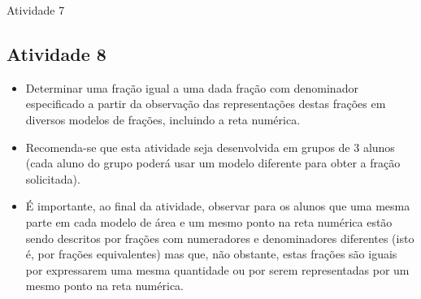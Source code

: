 \begin{multicols}{2}
\begin{resposta*}{Atividade 7}
  
\end{resposta*}

\Bg
\Bg

\subsection{Atividade 8}

\begin{itemize} %
    \item       Determinar uma fração igual a uma dada fração com denominador 
especificado a partir da observação das representações destas frações em 
diversos modelos de frações, incluindo a reta numérica.
\end{itemize} %
  
 
\begin{itemize} %
    \item       Recomenda-se que esta atividade seja desenvolvida em grupos de 3 
alunos (cada aluno do grupo poderá usar um modelo diferente para obter a fração 
solicitada).
    \item       É importante, ao final da atividade, observar para os alunos que 
uma mesma parte em cada modelo de área e um mesmo ponto na reta numérica estão 
sendo descritos por frações com numeradores e denominadores diferentes (isto é, 
por frações equivalentes) mas que, não obstante, estas frações são iguais por 
expressarem uma mesma quantidade ou por serem representadas por um mesmo ponto 
na reta numérica. 
\end{itemize} %
  

\end{multicols}

